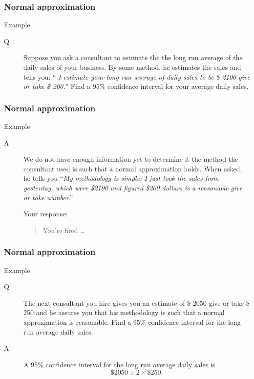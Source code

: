 \documentclass[handout]{beamer}
\begin{document}

   \begin{frame} \frametitle{Normal approximation}

    \begin{block}
     {Example}
     \begin{description}
       \item[Q] Suppose you ask a consultant to estimate
      the the long run average of the daily sales of your business.
      By some method,
      he estimates the sales and tells you:
      ``{\em
        I estimate your long run average of daily sales to
        be \$ 2100 give or take
        \$ 200.}''
      Find a 95\% confidence interval for your average daily sales.
     \end{description}
   \end{block}
   \end{frame}


   \begin{frame} \frametitle{Normal approximation}

    \begin{block}
     {Example}
     \begin{description}
       \item[A] We do not have enough information yet to determine
      it the method the consultant used is such that a normal
      approximation holds.
       When asked, he tells you ``{\em My methodology is simple: I just took the sales from yesterday, which were \$2100 and figured \$200 dollars is a reasonable give or take number}.''

      Your response:
      \begin{quote}
        You're fired \dots
      \end{quote}
     \end{description}
   \end{block}
   \end{frame}


   \begin{frame} \frametitle{Normal approximation}

    \begin{block}
     {Example}
     \begin{description}
      \item[Q] The next consultant you hire gives you an estimate
      of \$ 2050 give or take \$ 250 and he assures you
      that his methodology is such that a normal approximation is reasonable.
      Find a 95\% confidence interval for the long run average daily sales.
       \item[A] A 95\% confidence interval for the long run average
       daily sales is
       $$
       \$ 2050 \pm 2 \times \$ 250.
       $$
     \end{description}
   \end{block}
   \end{frame}
\end{document}
